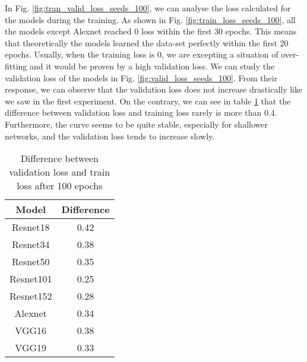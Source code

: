 In Fig. \ref{fig:tran_valid_loss_seeds_100}, we can analyse the loss calculated for the models during the training. As shown in Fig. \ref{fig:train_loss_seeds_100}, all the models except Alexnet reached 0 loss within the first 30 epochs. This means that theoretically the models learned the data-set perfectly within the first 20 epochs. Usually, when the training loss is 0, we are excepting a situation of over-fitting and it would be proven by a high validation loss. We can study the validation loss of the models in Fig. \ref{fig:valid_loss_seeds_100}. From their response, we can observe that the validation loss does not increase drastically like we saw in the first experiment. On the contrary, we can see in table \ref{tab:difference_val_tra_loss} that the difference between validation loss and training loss rarely is more than 0.4. Furthermore, the curve seems to be quite stable, especially for shallower networks, and the validation loss tends to increase slowly. \\


\begin{table}[h]
\centering
        \begin{tabular}{ c c  }
                 Model&Difference\\
                 \hline
                   Resnet18&0.42\\
                    Resnet34&0.38\\
                    Resnet50&0.35\\
                    Resnet101&0.25\\
                    Resnet152&0.28\\
                    Alexnet&0.34\\
                        VGG16&0.38\\
                    VGG19&0.33\\
                    \end{tabular}
                    \caption{Difference between validation loss and train loss after 100 epochs }                   
                     \label{tab:difference_val_tra_loss}
     \end{table} 


